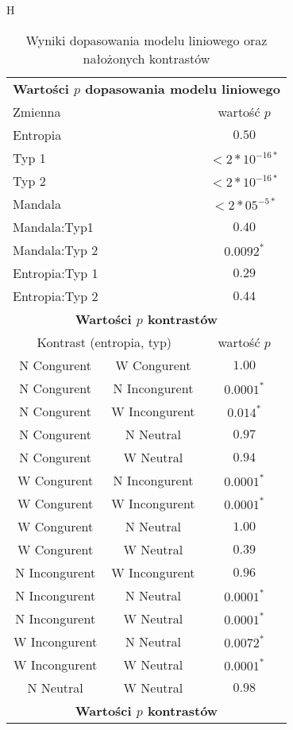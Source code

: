 \documentclass[12pt,a4paper,final,oneside,onecolumn,titlepage]{article}
\begin{document}
\begin{table}{H}
\caption{Wyniki dopasowania modelu liniowego oraz nałożonych kontrastów}
\centering
\begin{tabular}{c c c}
\hline\hline
\multicolumn{3}{c}{\textbf{Wartości $p$ dopasowania modelu liniowego}} \\ [0.5ex]
\multicolumn{2}{l}{Zmienna} & wartość $p$ \\
\hline
\multicolumn{2}{l}{Entropia} & $0.50$ \\
\multicolumn{2}{l}{Typ 1} & $<2*10^{-16*}$ \\
\multicolumn{2}{l}{Typ 2} & $<2*10^{-16*}$ \\
\multicolumn{2}{l}{Mandala} & $<2*05^{-5*}$ \\ 
\multicolumn{2}{l}{Mandala:Typ1} & $0.40$ \\
\multicolumn{2}{l}{Mandala:Typ 2} & $0.0092^*$ \\
\multicolumn{2}{l}{Entropia:Typ 1} & $0.29$ \\
\multicolumn{2}{l}{Entropia:Typ 2} & $0.44$ \\ [1ex]
\hline
\multicolumn{3}{c}{\textbf{Wartości $p$ kontrastów}} \\ [0.5ex]
\multicolumn{2}{c}{Kontrast (entropia, typ)} & wartość $p$ \\
\hline
N Congurent & W Congurent & $1.00$ \\
N Congurent & N Incongurent & $0.0001^*$ \\
N Congurent & W Incongurent & $0.014^*$ \\
N Congurent & N Neutral & $0.97$ \\
N Congurent & W Neutral & $0.94$ \\
W Congurent & N Incongurent & $0.0001^*$ \\
W Congurent & W Incongurent & $0.0001^*$ \\
W Congurent & N Neutral & $1.00$ \\
W Congurent & W Neutral & $0.39$ \\
N Incongurent & W Incongurent & $0.96$ \\
N Incongurent & N Neutral & $0.0001^*$ \\
N Incongurent & W Neutral & $0.0001^*$ \\
W Incongurent & N Neutral & $0.0072^*$ \\
W Incongurent & W Neutral & $0.0001^*$ \\
N Neutral & W Neutral & $0.98$ \\ [1ex]
\hline
\multicolumn{3}{c}{\textbf{Wartości $p$ kontrastów}} \\ [0.5ex]

\end{tabular}
\end{table}
\end{document}
